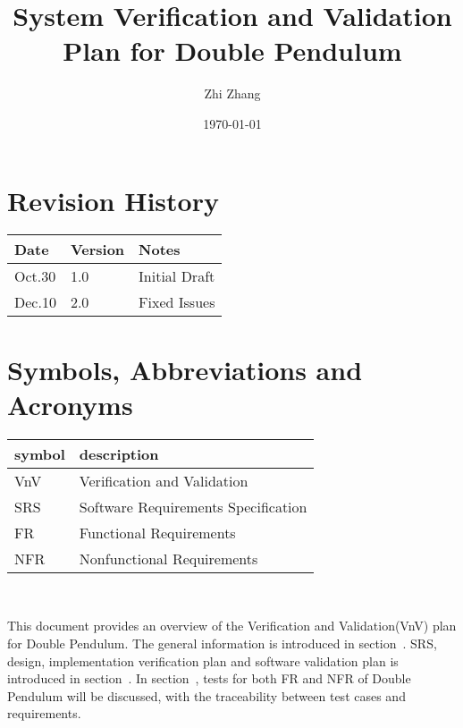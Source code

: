 \documentclass[12pt, titlepage]{article}
\begin{document}
\title{System Verification and Validation Plan for Double Pendulum} 
\author{Zhi Zhang}
\date{\today}
	
\maketitle


\section{Revision History}

\begin{tabularx}{\textwidth}{p{3cm}p{2cm}X}
\toprule {\bf Date} & {\bf Version} & {\bf Notes}\\
\midrule
Oct.30 & 1.0 & Initial Draft\\
Dec.10 & 2.0 & Fixed Issues\\

\bottomrule
\end{tabularx}

\newpage

\tableofcontents

\listoftables

\listoffigures

\newpage

\section{Symbols, Abbreviations and Acronyms}

\renewcommand{\arraystretch}{1.2}
\begin{tabular}{l l} 
  \toprule		
  \textbf{symbol} & \textbf{description}\\
  \midrule 
  VnV & Verification and Validation\\
  SRS & Software Requirements Specification\\
  FR & Functional Requirements\\
  NFR & Nonfunctional Requirements\\
  \bottomrule
\end{tabular}\\

\newpage


This document provides an overview of the Verification and Validation(VnV) plan
for Double Pendulum. The general information is introduced in
section~. SRS, design, implementation verification plan
and software validation plan is introduced in section~. In
section~, tests for both FR and NFR of Double Pendulum will
be discussed, with the traceability between test cases and requirements.
\end{document}
